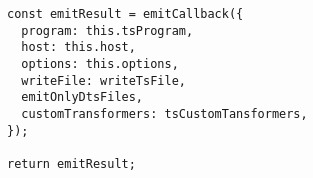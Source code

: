 \begin{verbatim}
const emitResult = emitCallback({
  program: this.tsProgram,
  host: this.host,
  options: this.options,
  writeFile: writeTsFile,
  emitOnlyDtsFiles,
  customTransformers: tsCustomTansformers,
});

return emitResult;
\end{verbatim}
